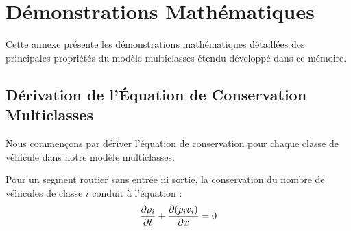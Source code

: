 \chapter{Démonstrations Mathématiques}
\label{annexe:demonstrations}

Cette annexe présente les démonstrations mathématiques détaillées des principales propriétés du modèle multiclasses étendu développé dans ce mémoire.

\section{Dérivation de l'Équation de Conservation Multiclasses}
\label{sec:derivation_conservation}

Nous commençons par dériver l'équation de conservation pour chaque classe de véhicule dans notre modèle multiclasses.

\begin{proposition}
Pour un segment routier sans entrée ni sortie, la conservation du nombre de véhicules de classe $i$ conduit à l'équation :
\begin{equation}
\frac{\partial \rho_{i}}{\partial t} + \frac{\partial (\rho_{i}v_{i})}{\partial x} = 0
\end{equation}
\end{proposition}


